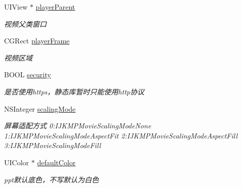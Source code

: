 \begin{DoxyCompactItemize}
U\+I\+View $\ast$ \hyperlink{interface_play_parameter_a063b2a3b60adced28f74d6890d32d7af}{player\+Parent}
\begin{DoxyCompactList}\small\item\em 视频父类窗口 \end{DoxyCompactList}\item 
\mbox{\label{interface_play_parameter_a3f824515b9c9cdcb05f2863423bd284b}} 
C\+G\+Rect \hyperlink{interface_play_parameter_a3f824515b9c9cdcb05f2863423bd284b}{player\+Frame}
\begin{DoxyCompactList}\small\item\em 视频区域 \end{DoxyCompactList}\item 
\mbox{\label{interface_play_parameter_ad58a58a2ca6913a15bdf5a80d5123d99}} 
B\+O\+OL \hyperlink{interface_play_parameter_ad58a58a2ca6913a15bdf5a80d5123d99}{security}
\begin{DoxyCompactList}\small\item\em 是否使用https，静态库暂时只能使用http协议 \end{DoxyCompactList}\item 
\mbox{\label{interface_play_parameter_a0a96b9ef62e69167ca1fb8b405e45119}} 
N\+S\+Integer \hyperlink{interface_play_parameter_a0a96b9ef62e69167ca1fb8b405e45119}{scaling\+Mode}
\begin{DoxyCompactList}\small\item\em 屏幕适配方式 0\+:I\+J\+K\+M\+P\+Movie\+Scaling\+Mode\+None 1\+:I\+J\+K\+M\+P\+Movie\+Scaling\+Mode\+Aspect\+Fit 2\+:I\+J\+K\+M\+P\+Movie\+Scaling\+Mode\+Aspect\+Fill 3\+:I\+J\+K\+M\+P\+Movie\+Scaling\+Mode\+Fill \end{DoxyCompactList}\item 
\mbox{\label{interface_play_parameter_a0fc1c1924c6f27620ebc316cff688e54}} 
U\+I\+Color $\ast$ \hyperlink{interface_play_parameter_a0fc1c1924c6f27620ebc316cff688e54}{default\+Color}
\begin{DoxyCompactList}\small\item\em ppt默认底色，不写默认为白色 \end{DoxyCompactList}\item 
\mbox{\label{interface_play_parameter_a1044bc3b8162768a634f63d11689c6f9}} 

\end{DoxyCompactItemize}
